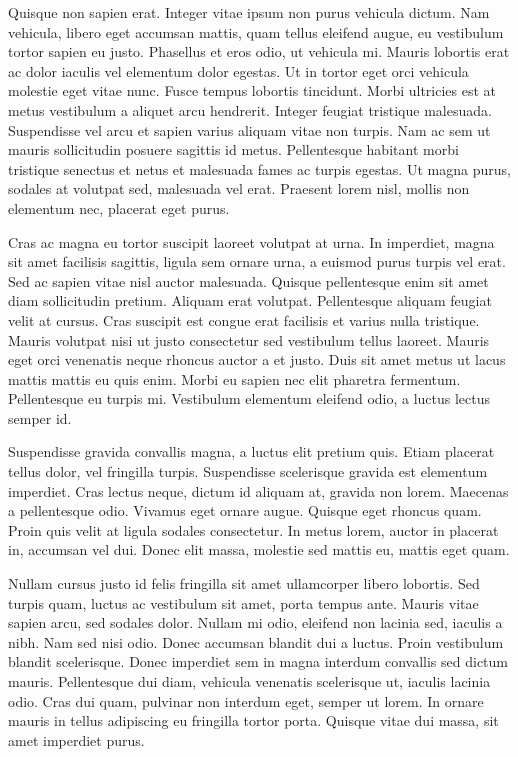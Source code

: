 \documentclass[a4paper]{article}
\begin{document}
Quisque non sapien erat. Integer vitae ipsum non purus vehicula dictum. Nam vehicula, libero eget accumsan mattis, quam tellus eleifend augue, eu vestibulum tortor sapien eu justo. Phasellus et eros odio, ut vehicula mi. Mauris lobortis erat ac dolor iaculis vel elementum dolor egestas. Ut in tortor eget orci vehicula molestie eget vitae nunc. Fusce tempus lobortis tincidunt. Morbi ultricies est at metus vestibulum a aliquet arcu hendrerit. Integer feugiat tristique malesuada. Suspendisse vel arcu et sapien varius aliquam vitae non turpis. Nam ac sem ut mauris sollicitudin posuere sagittis id metus. Pellentesque habitant morbi tristique senectus et netus et malesuada fames ac turpis egestas. Ut magna purus, sodales at volutpat sed, malesuada vel erat. Praesent lorem nisl, mollis non elementum nec, placerat eget purus.

Cras ac magna eu tortor suscipit laoreet volutpat at urna. In imperdiet, magna sit amet facilisis sagittis, ligula sem ornare urna, a euismod purus turpis vel erat. Sed ac sapien vitae nisl auctor malesuada. Quisque pellentesque enim sit amet diam sollicitudin pretium. Aliquam erat volutpat. Pellentesque aliquam feugiat velit at cursus. Cras suscipit est congue erat facilisis et varius nulla tristique. Mauris volutpat nisi ut justo consectetur sed vestibulum tellus laoreet. Mauris eget orci venenatis neque rhoncus auctor a et justo. Duis sit amet metus ut lacus mattis mattis eu quis enim. Morbi eu sapien nec elit pharetra fermentum. Pellentesque eu turpis mi. Vestibulum elementum eleifend odio, a luctus lectus semper id.

Suspendisse gravida convallis magna, a luctus elit pretium quis. Etiam placerat tellus dolor, vel fringilla turpis. Suspendisse scelerisque gravida est elementum imperdiet. Cras lectus neque, dictum id aliquam at, gravida non lorem. Maecenas a pellentesque odio. Vivamus eget ornare augue. Quisque eget rhoncus quam. Proin quis velit at ligula sodales consectetur. In metus lorem, auctor in placerat in, accumsan vel dui. Donec elit massa, molestie sed mattis eu, mattis eget quam.

Nullam cursus justo id felis fringilla sit amet ullamcorper libero lobortis. Sed turpis quam, luctus ac vestibulum sit amet, porta tempus ante. Mauris vitae sapien arcu, sed sodales dolor. Nullam mi odio, eleifend non lacinia sed, iaculis a nibh. Nam sed nisi odio. Donec accumsan blandit dui a luctus. Proin vestibulum blandit scelerisque. Donec imperdiet sem in magna interdum convallis sed dictum mauris. Pellentesque dui diam, vehicula venenatis scelerisque ut, iaculis lacinia odio. Cras dui quam, pulvinar non interdum eget, semper ut lorem. In ornare mauris in tellus adipiscing eu fringilla tortor porta. Quisque vitae dui massa, sit amet imperdiet purus.
\end{document}
